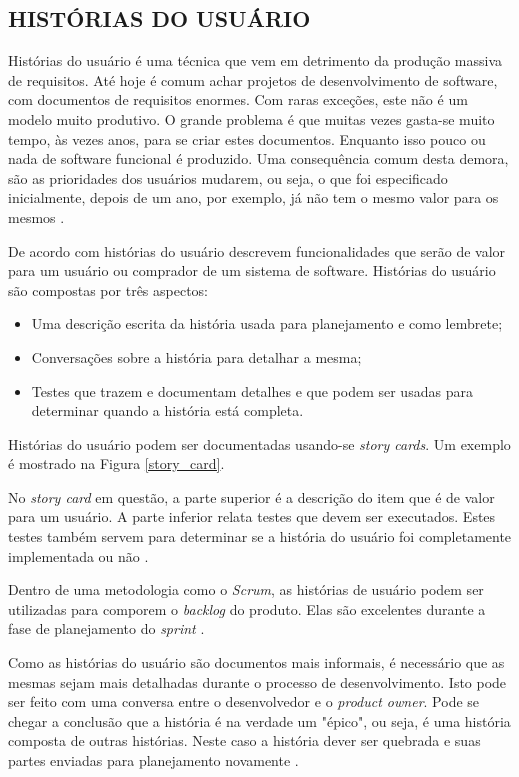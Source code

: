 \subsection{HISTÓRIAS DO USUÁRIO}
\label{user_stories_sec}

Histórias do usuário é uma técnica que vem em detrimento da produção massiva de requisitos. 
Até hoje é comum achar projetos de desenvolvimento de software, com documentos de requisitos enormes. 
Com raras exceções, este não é um modelo muito produtivo. 
O grande problema é que muitas vezes gasta-se muito tempo, às vezes anos, para se criar estes documentos. 
Enquanto isso pouco ou nada de software funcional é produzido. 
Uma consequência comum desta demora, são as prioridades dos usuários mudarem, ou seja, o que foi especificado inicialmente, depois de um ano, por exemplo, já não tem o mesmo valor para os mesmos \cite{Patton2014}.

De acordo com  histórias do usuário descrevem funcionalidades que serão de valor para um usuário ou comprador de um sistema de software. Histórias do usuário são compostas por três aspectos: 
\begin{itemize}
	\item Uma descrição escrita da história usada para planejamento e como lembrete;
	\item Conversações sobre a história para detalhar a mesma;
	\item Testes que trazem e documentam detalhes e que podem ser usadas para determinar quando a história está completa.
\end{itemize}

Histórias do usuário podem ser documentadas usando-se \emph{story cards}. Um exemplo é mostrado na Figura \ref{story_card}.

No \emph{story card} em questão, a parte superior é a descrição do item que é de valor para um usuário. 
A parte inferior relata testes que devem ser executados. 
Estes testes também servem para determinar se a história do usuário foi completamente implementada ou não \cite{cohn2004}.

Dentro de uma metodologia como o \emph{Scrum}, as histórias de usuário podem ser utilizadas para comporem o \emph{backlog} do produto. 
Elas são excelentes durante a fase de planejamento do \emph{sprint} \cite{Hanley2015}. 

Como as histórias do usuário são documentos mais informais, é necessário que as mesmas sejam mais detalhadas durante o processo de desenvolvimento. 
Isto pode ser feito com uma conversa entre o desenvolvedor e o \emph{product owner}. 
Pode se chegar a conclusão que a história é na verdade um "épico", ou seja, é uma história composta de outras histórias. 
Neste caso a história dever ser quebrada e suas partes enviadas para planejamento novamente \cite{cohn2004}. 

